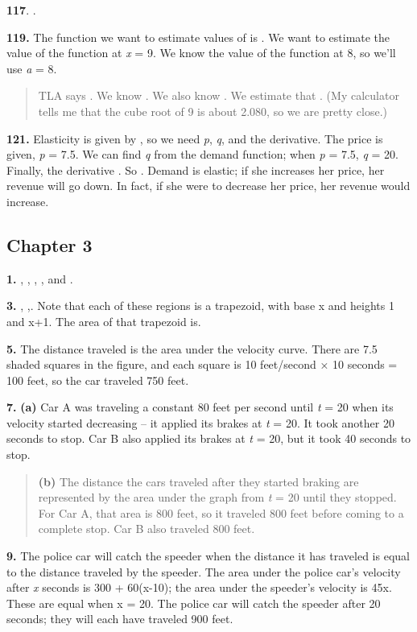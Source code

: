 \textbf{117}. .

\textbf{119.} The function we want to estimate values of is . We want to
estimate the value of the function at \emph{x} = 9. We know the value of
the function at 8, so we'll use \emph{a} = 8.

\begin{quote}
TLA says . We know . We also know . We estimate that . (My calculator
tells me that the cube root of 9 is about 2.080, so we are pretty
close.)
\end{quote}

\textbf{121.} Elasticity is given by , so we need \emph{p}, \emph{q},
and the derivative. The price is given, \emph{p} = 7.5. We can find
\emph{q} from the demand function; when \emph{p} = 7.5, \emph{q} = 20.
Finally, the derivative . So . Demand is elastic; if she increases her
price, her revenue will go down. In fact, if she were to decrease her
price, her revenue would increase.

\hypertarget{chapter-3}{\subsection{Chapter 3}\label{chapter-3}}

\textbf{1.} , , , , and .

\textbf{3.} , ,. Note that each of these regions is a trapezoid, with
base x and heights 1 and x+1. The area of that trapezoid is.

\textbf{5.} The distance traveled is the area under the velocity curve.
There are 7.5 shaded squares in the figure, and each square is 10
feet/second × 10 seconds = 100 feet, so the car traveled 750 feet.

\textbf{7.} \textbf{(a)} Car A was traveling a constant 80 feet per
second until \emph{t} = 20 when its velocity started decreasing -- it
applied its brakes at \emph{t} = 20. It took another 20 seconds to stop.
Car B also applied its brakes at \emph{t} = 20, but it took 40 seconds
to stop.

\begin{quote}
\textbf{(b)} The distance the cars traveled after they started braking
are represented by the area under the graph from \emph{t} = 20 until
they stopped. For Car A, that area is 800 feet, so it traveled 800 feet
before coming to a complete stop. Car B also traveled 800 feet.
\end{quote}

\textbf{9.} The police car will catch the speeder when the distance it
has traveled is equal to the distance traveled by the speeder. The area
under the police car's velocity after \emph{x} seconds is 300 +
60(x-10); the area under the speeder's velocity is 45x. These are equal
when x = 20. The police car will catch the speeder after 20 seconds;
they will each have traveled 900 feet.

